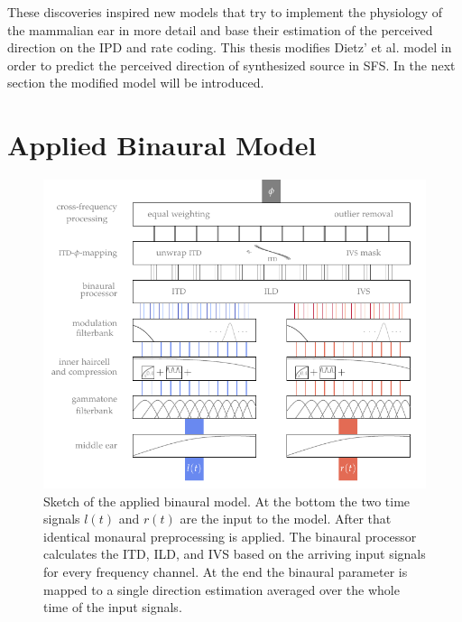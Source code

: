 These discoveries inspired new models that try to implement the
physiology of the mammalian ear in more detail and base their estimation of the
perceived direction on the \ac{IPD} and rate
coding.
This thesis modifies Dietz' et al.\autocite{Dietz2011} model in order to predict
the perceived direction of synthesized source in \ac{SFS}.
In the next section the modified model will be introduced.


\section{Applied Binaural Model}
\label{sec:applied_binaural_model}
%
\begin{figure}
    \centering
    \hspace*{-1.2cm}\includegraphics{fig6_01/fig6_01}
    \caption{Sketch of the applied binaural model.
    At the bottom the two time signals $l(t)$ and $r(t)$ are the input to the
    model. After that identical monaural preprocessing is applied. The binaural
    processor calculates the \ac{ITD}, \ac{ILD}, and \ac{IVS} based on the
    arriving input signals for every frequency channel. At the end the binaural
    parameter is mapped to a single direction estimation averaged over the whole
    time of the input signals.
    \label{fig:sketch_dietz_model}}
\end{figure}
%


